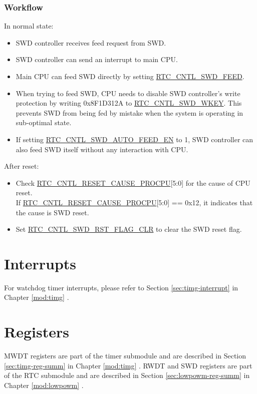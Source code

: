 \documentclass[main\_\_EN.tex]{subfiles}
\begin{document}
\subsubsection{Workflow}
In normal state:
\begin{itemize}
    \item SWD controller receives feed request from SWD.
    \item SWD controller can send an interrupt to main CPU.
    \item Main CPU can feed SWD directly by setting \hyperref[fielddesc:RTCCNTLSWDFEED]{RTC\_CNTL\_SWD\_FEED}.
    \item When trying to feed SWD, CPU needs to disable SWD controller's write protection by writing 0x8F1D312A to \hyperref[fielddesc:RTCCNTLSWDWKEY]{RTC\_CNTL\_SWD\_WKEY}. This prevents SWD from being fed by mistake when the system is operating in sub-optimal state.
    \item If setting \hyperref[fielddesc:RTCCNTLSWDAUTOFEEDEN]{RTC\_CNTL\_SWD\_AUTO\_FEED\_EN} to 1, SWD controller can also feed SWD itself without any interaction with CPU.
\end{itemize}

After reset:
\begin{itemize}
    \item Check \hyperref[fielddesc:RTCCNTLRESETCAUSEPROCPU]{RTC\_CNTL\_RESET\_CAUSE\_PROCPU}[5:0] for the cause of CPU reset.\\
	If \hyperref[fielddesc:RTCCNTLRESETCAUSEPROCPU]{RTC\_CNTL\_RESET\_CAUSE\_PROCPU}[5:0] == 0x12, it indicates that the cause is SWD reset.
	\item Set \hyperref[fielddesc:RTCCNTLSWDRSTFLAGCLR]{RTC\_CNTL\_SWD\_RST\_FLAG\_CLR} to clear the SWD reset flag.
\end{itemize}

\section{Interrupts}

For watchdog timer interrupts, please refer to Section \ref{sec:timg-interrupt} \textit{} in Chapter \ref{mod:timg} \textit{}.



\section{Registers}

MWDT registers are part of the timer submodule and are described in Section \ref{sec:timg-reg-summ} \textit{} in Chapter \ref{mod:timg} \textit{}. RWDT and SWD registers are part of the RTC submodule and are described in Section \ref{sec:lowpowm-reg-summ} \textit{} in Chapter \ref{mod:lowpowm} \textit{}.
\end{document}
